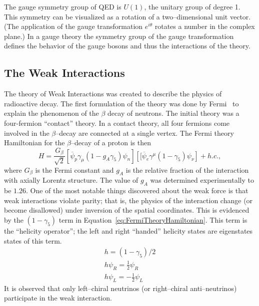 The gauge symmetry group of QED is $U(1)$, the unitary group of degree 1.  This
symmetry can be visualized as a rotation of a two--dimensional unit vector. (The
application of the gauge transformation $e^{i\theta}$ rotates a number in the
complex plane.)  In a gauge theory the symmetry group of the gauge
transformation defines the behavior of the gauge bosons and thus the
interactions of the theory.  

\subsection{The Weak Interactions}
\label{sec:WeakInteractions}
The theory of Weak Interactions was created to describe the physics of
radioactive decay.  The first formulation of the theory was done by
Fermi~\cite{Fermi:1934hr} to explain the phenomenon of the $\beta$
decay of neutrons. The initial theory was a four-fermion ``contact'' theory.  In
a contact theory, all four fermions come involved in the $\beta$--decay are
connected at a single vertex.  The Fermi theory Hamiltonian for the
$\beta$--decay of a proton is then~\cite{Morii:SMandBSM}
\begin{equation}
  H = \frac{G_\beta}{\sqrt{2}}
  \left[\overline \psi_p \gamma_\mu (1 - g_A\gamma_5)\psi_n\right]
  \left[[\overline \psi_e \gamma^\mu (1 - \gamma_5) \psi_\nu\right] + h.c., 
 \label{eq:FermiTheoryHamiltonian}
\end{equation}
where $G_\beta$ is the Fermi constant and $g_A$ is the relative fraction of the
interaction with axially Lorentz structure.  The value of $g_A$ was determined
experimentally to be $1.26$.  One of the most notable things discovered about
the weak force is that weak interactions violate parity; that is, the physics of
the interaction change (or become disallowed) under inversion of the spatial
coordinates.  This is evidenced by the $(1-\gamma_5)$ term in
Equation~\ref{eq:FermiTheoryHamiltonian}.  This term is the ``helicity
operator''; the left and right ``handed'' helicity states are eigenstates states
of this term.
\begin{eqnarray}
  h = (1 - \gamma_5)/2 \nonumber \\
  h\psi_R = \frac{1}{2}\psi_R \nonumber \\ 
  h\psi_L = -\frac{1}{2}\psi_L \nonumber
\end{eqnarray}
It is observed that only left--chiral neutrinos (or right--chiral
anti--neutrinos) participate in the weak interaction.

